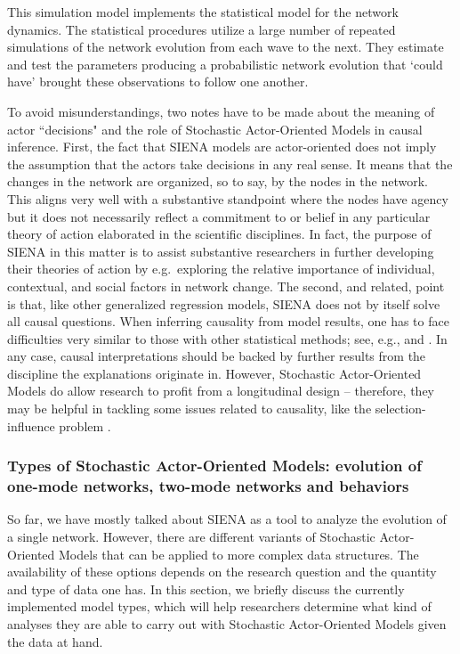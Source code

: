 \documentclass[a4paper,fleqn,11pt]{article}
\newcommand{\+}{\, + \,}
\newcommand{\SI}{{\sf SIENA }}
\newcommand{\saom}{{Stochastic Actor-Oriented Model}}
\begin{document}
This simulation model implements the statistical model
for the network dynamics. The statistical procedures utilize
a large number of repeated simulations of the network evolution
from each wave to the next. They estimate and test the parameters
producing a probabilistic network evolution
that `could have' brought these observations to follow one another.

To avoid misunderstandings, two notes have to be made about the
meaning of actor ``decisions" and the role of {\saom}s in causal inference.
First, the fact that \SI models are actor-oriented does not imply the assumption
that the actors take
decisions in any real sense. It means that the changes in the network are
organized, so to say, by the nodes in the network. This aligns very well
with a substantive standpoint where the nodes have agency \citep{Snijders96}
but it does not necessarily reflect a commitment to or belief in any particular
theory of action elaborated in
the scientific disciplines. In fact, the purpose of \SI in this matter is
to assist substantive researchers in further developing their theories
of action by e.g.\ exploring the relative importance of individual,
contextual, and social factors in network change. The second, and related,
point is that, like other generalized regression models, \SI does not
by itself solve all causal questions. When inferring causality from model
results, one has to face difficulties very similar to those with other
statistical methods; see, e.g., \citet{LSST11} and \citet{Goldthorpe2001}.
In any case, causal interpretations should be backed by further results
from the discipline the explanations originate in. However, {\saom}s do allow research to profit from a longitudinal
design -- therefore, they may be helpful in tackling some issues related
to causality, like the selection-influence problem \citep{SteglichEA10, LSST11}.

\subsubsection[Types of {\saom}s]
     {Types of {\saom}s: \protect\newline
     evolution of one-mode networks, two-mode networks and behaviors}
\label{S_types}

So far, we have mostly talked about \SI as a tool to analyze the evolution
of a single network. However, there are different variants of {\saom}s that
can be applied to more complex data structures.
The availability of these options depends on the research question and the
quantity and type of data one has. In this section, we briefly discuss the
currently implemented model types, which will help researchers determine what
kind of analyses they are able to carry out with {\saom}s
given the data at hand.
\end{document}
